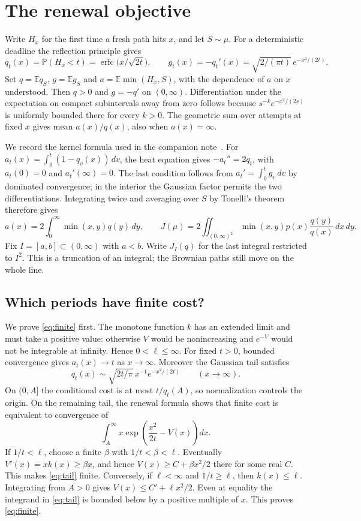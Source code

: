 \documentclass[11pt]{article}
\newcommand{\E}{\mathbb E}
\newcommand{\Prob}{\mathbb P}
\newcommand{\erfc}{\operatorname{erfc}}
\begin{document}
\section{The renewal objective}
Write $H_x$ for the first time a fresh path hits $x$, and let $S\sim\mu$.
For a deterministic deadline the reflection principle gives
\[
 q_t(x)=\Prob(H_x<t)=\erfc\!\bigl(x/\sqrt{2t}\bigr),\qquad
 g_t(x)=-q_t'(x)=\sqrt{2/(\pi t)}\,e^{-x^2/(2t)} .
\]
Set $q=\E q_S$, $g=\E g_S$ and $a=\E\min(H_x,S)$, with the dependence of
$a$ on $x$ understood. Then $q>0$ and $g=-q'$ on $(0,\infty)$.
Differentiation under the expectation on compact subintervals away from zero
follows because $s^{-k} e^{-x^2/(2s)}$ is uniformly bounded there for
every $k>0$. The geometric sum over attempts at fixed $x$ gives mean
$a(x)/q(x)$, also when $a(x)=\infty$.

We record the kernel formula used in the companion note~\cite{note}.
For $a_t(x)=\int_0^t(1-q_v(x))\,dv$, the heat equation gives
$-a_t''=2q_t$, with $a_t(0)=0$ and $a_t'(\infty)=0$. The last condition
follows from $a_t'=\int_0^t g_v\,dv$ by dominated convergence; in the
interior the Gaussian factor permits the two differentiations.
Integrating twice and averaging over $S$ by Tonelli's theorem therefore gives
\begin{equation}\label{eq:J}
 a(x)=2\int_0^\infty\min(x,y)q(y)\,dy,\qquad
 J(\mu)=2\iint_{(0,\infty)^2}\min(x,y)p(x)\frac{q(y)}{q(x)}\,dx\,dy .
\end{equation}
Fix $I=[a,b]\subset(0,\infty)$ with $a<b$. Write $J_I(q)$ for the last
integral restricted to $I^2$. This is a truncation of an integral; the
Brownian paths still move on the whole line.

\subsection*{Which periods have finite cost?}
We prove \eqref{eq:finite} first. The monotone function $k$ has an extended
limit and must take a positive value: otherwise $V$ would be nonincreasing
and $e^{-V}$ would not be integrable at infinity. Hence $0<\ell\le\infty$.
For fixed $t>0$, bounded convergence gives $a_t(x)\to t$ as $x\to\infty$.
Moreover the Gaussian tail satisfies
\[
 q_t(x)\sim \sqrt{2t/\pi}\,x^{-1}e^{-x^2/(2t)}
 \qquad(x\to\infty).
\]
On $(0,A]$ the conditional cost is at most $t/q_t(A)$, so normalization
controls the origin. On the remaining tail, the renewal formula shows that
finite cost is equivalent to convergence of
\begin{equation}\label{eq:tail}
 \int_A^\infty x\exp\!\left(\frac{x^2}{2t}-V(x)\right)dx .
\end{equation}
If $1/t<\ell$, choose a finite $\beta$ with $1/t<\beta<\ell$. Eventually
$V'(x)=xk(x)\ge\beta x$, and hence $V(x)\ge C+\beta x^2/2$ there for
some real $C$. This makes \eqref{eq:tail} finite. Conversely, if
$\ell<\infty$ and $1/t\ge\ell$, then $k(x)\le\ell$. Integrating from
$A>0$ gives $V(x)\le C'+\ell x^2/2$. Even at equality the integrand in
\eqref{eq:tail} is bounded below by a positive multiple of $x$. This proves
\eqref{eq:finite}.
\end{document}
